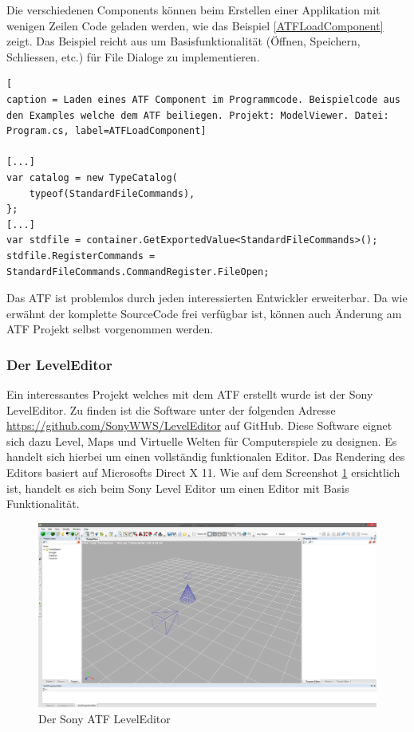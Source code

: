 \documentclass[pagesize, paper=a4, fontsize=12pt, titlepage=true, headings=small, headnosepline, abstractoff, liststotoc, nochapterprefix, plainheadsepline, twoside]{scrreprt}
\begin{document}
Die verschiedenen Components können beim Erstellen einer Applikation mit wenigen Zeilen Code geladen werden, wie das Beispiel \ref{ATFLoadComponent} zeigt. Das Beispiel reicht aus um Basisfunktionalität (Öffnen, Speichern, Schliessen, etc.) für File Dialoge zu implementieren.

\begin{lstlisting}[
caption = Laden eines ATF Component im Programmcode. Beispielcode aus den Examples welche dem ATF beiliegen. Projekt: ModelViewer. Datei: Program.cs, label=ATFLoadComponent]

[...]
var catalog = new TypeCatalog(
	typeof(StandardFileCommands),
};
[...]
var stdfile = container.GetExportedValue<StandardFileCommands>();
stdfile.RegisterCommands = StandardFileCommands.CommandRegister.FileOpen;

\end{lstlisting}

Das ATF ist problemlos durch jeden interessierten Entwickler erweiterbar. Da wie erwähnt der komplette SourceCode frei verfügbar ist, können auch Änderung am ATF Projekt selbst vorgenommen werden.

\subsubsection{Der LevelEditor}
Ein interessantes Projekt welches mit dem ATF erstellt wurde ist der Sony LevelEditor. Zu finden ist die Software unter der folgenden Adresse \url{https://github.com/SonyWWS/LevelEditor} auf GitHub. Diese Software eignet sich dazu Level, Maps und Virtuelle Welten für Computerspiele zu designen. Es handelt sich hierbei um einen vollständig funktionalen Editor. Das Rendering des Editors basiert auf Microsofts Direct X 11. Wie auf dem Screenshot \ref{SonyATFLevelEditor} ersichtlich ist, handelt es sich beim Sony Level Editor um einen Editor mit Basis Funktionalität. 

\begin{figure}[ht]
	\centering
	\includegraphics[width=\linewidth]{Bilder/ATFLevelEditor.jpg}
	\caption{Der Sony ATF LevelEditor}
	\label{SonyATFLevelEditor}
\end{figure}
\end{document}
